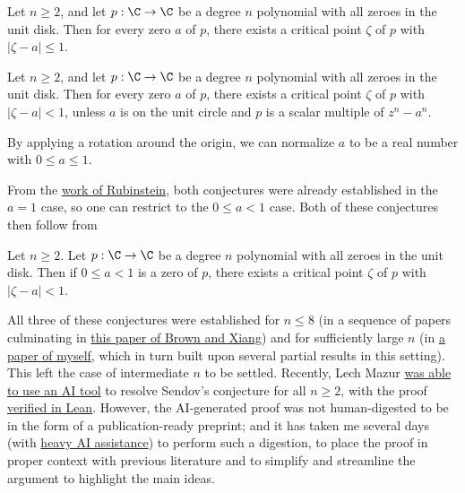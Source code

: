 \documentclass[12pt]{article}
\begin{document}

\begin{conjecture}  Let $n \geq 2$, and let $p : \C \to \C$ be a degree $n$ polynomial with all zeroes in the unit disk.  Then for every zero $a$ of $p$, there exists a critical point $\zeta$ of $p$ with $|\zeta-a| \leq 1$.
\end{conjecture}

\begin{conjecture}  Let $n \geq 2$, and let $p : \C \to \C$ be a degree $n$ polynomial with all zeroes in the unit disk.  Then for every zero $a$ of $p$, there exists a critical point $\zeta$ of $p$ with $|\zeta-a| < 1$, unless $a$ is on the unit circle and $p$ is a scalar multiple of $z^n - a^n$.
\end{conjecture}

By applying a rotation around the origin, we can normalize $a$ to be a real number with $0 \leq a \leq 1$.  

From the \href{???}{work of Rubinstein}, both conjectures were already established in the $a=1$ case, so one can restrict to the $0 \leq a < 1$ case.  Both of these conjectures then follow from

\begin{conjecture}\label{interior}  Let $n \geq 2$.  Let $p : \C \to \C$ be a degree $n$ polynomial with all zeroes in the unit disk.  Then if $0 \leq a < 1$ is a zero of $p$, there exists a critical point $\zeta$ of $p$ with $|\zeta-a| < 1$.
\end{conjecture}

All three of these conjectures were established for $n \leq 8$ (in a sequence of papers culminating in \href{???}{this paper of Brown and Xiang}) and for sufficiently large $n$ (in \href{???}{a paper of myself}, which in turn built upon several partial results in this setting).  This left the case of intermediate $n$ to be settled.  Recently, Lech Mazur \href{???}{was able to use an AI tool} to resolve Sendov's conjecture for all $n \geq 2$, with the proof \href{???}{verified in Lean}.  However, the AI-generated proof was not human-digested to be in the form of a publication-ready preprint; and it has taken me several days (with \href{???}{heavy AI assistance}) to perform such a digestion, to place the proof in proper context with previous literature and to simplify and streamline the argument to highlight the main ideas.
\end{document}
